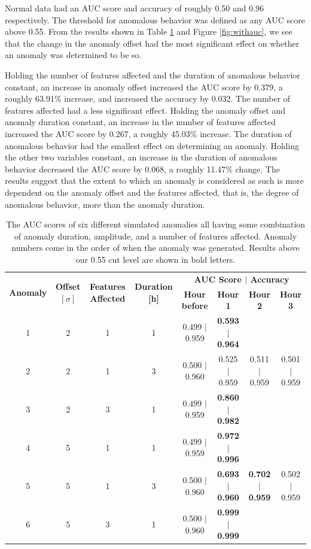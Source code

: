 \documentclass[5p]{elsarticle}
\begin{document}
Normal data had an AUC score and accuracy of ro\-ugh\-ly 0.50 and 0.96 respectively. 
The threshold for ano\-ma\-lo\-us behavior was defined as any AUC score above 0.55. 
From the results shown in Table \ref{table:bdtonfixed} and Figure \ref{fig:withauc}, we see that the change in the ano\-ma\-ly offset had the most significant effect on whether an ano\-ma\-ly was determined to be so.

Holding the number of features affected and the duration of anomalous behavior constant, an increase in ano\-ma\-ly offset increased the AUC score by 0.379, a roughly 63.91\% increase, and increased the accuracy by 0.032. The number of features affected had a less significant effect. Holding the ano\-ma\-ly offset and ano\-ma\-ly duration constant, an increase in the number of features affected increased the AUC score by 0.267, a roughly 45.03\% increase. The duration of ano\-ma\-lo\-us behavior had the smallest effect on determining an ano\-ma\-ly. Holding the other two variables constant, an increase in the duration of ano\-ma\-lo\-us behavior decreased the AUC score by 0.068, a roughly 11.47\% change. The results suggest that the extent to which an ano\-ma\-ly is considered as such is more dependent on the ano\-ma\-ly offset and the features affected, that is, the degree of anomalous behavior, more than the ano\-ma\-ly duration.

\begin{table}[htbp]
\centering
\caption{The AUC scores of six different simulated anomalies all having some combination of anomaly duration, amplitude, and a number of features affected. Anomaly numbers come in the order of when the anomaly was generated. Results above our 0.55 cut level are shown in bold letters.}
\label{table:bdtonfixed}
\resizebox{\linewidth}{!} {
\begin{tabular}{@{}cccccccc@{}}
\toprule
\multirow{2}{*}{\textbf{Anomaly}} &
\multirow{2}{*}{\textbf{Offset $[\sigma]$}} &
\multirow{2}{*}{\textbf{Features Affected}} &
\multirow{2}{*}{\textbf{Duration [h]}} &
\multicolumn{4}{c}{\textbf{AUC Score $\vert$ \textbf{Accuracy}}}   \\ 
\cmidrule(l){5-8} 
     &     &     &    & \textbf{Hour before} & \textbf{Hour 1} & \textbf{Hour 2} & \textbf{Hour 3} \\ 
\midrule
1    & 2   & 1   & 1  & 0.499 $\vert$ 0.959  & \textbf{0.593 $\vert$ 0.964}  &     &    \\
2    & 2   & 1   & 3  & 0.500 $\vert$ 0.960  & 0.525 $\vert$ 0.959  & 0.511 $\vert$ 0.959  & 0.501 $\vert$ 0.959  \\
3    & 2   & 3   & 1  & 0.499 $\vert$ 0.959  & \textbf{0.860 $\vert$ 0.982}  &     &     \\
4    & 5   & 1   & 1  & 0.499 $\vert$ 0.959  & \textbf{0.972 $\vert$ 0.996}  &     &     \\
5    & 5   & 1   & 3  & 0.500 $\vert$ 0.960  & \textbf{0.693 $\vert$ 0.960}  & \textbf{0.702 $\vert$ 0.959}  & 0.502 $\vert$ 0.959 \\
6    & 5   & 3   & 1  & 0.500 $\vert$ 0.960  & \textbf{0.999 $\vert$ 0.999}  &     &     \\ 
\bottomrule
\end{tabular}
}
\end{table}
\end{document}
